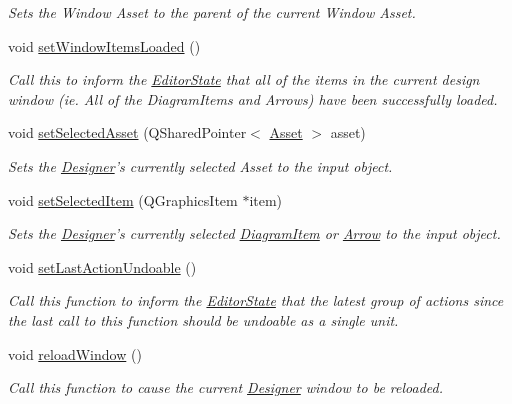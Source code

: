 \begin{DoxyCompactItemize}
\begin{DoxyCompactList}\small\item\em Sets the Window Asset to the parent of the current Window Asset. \end{DoxyCompactList}\item 
void \hyperlink{class_editor_state_acdada8168fd8de85fa44c38ffe621b31}{set\-Window\-Items\-Loaded} ()
\begin{DoxyCompactList}\small\item\em Call this to inform the \hyperlink{class_editor_state}{Editor\-State} that all of the items in the current design window (ie. All of the Diagram\-Items and Arrows) have been successfully loaded. \end{DoxyCompactList}\item 
void \hyperlink{class_editor_state_a1a3d4da1b215113cc85bbc546e7d2845}{set\-Selected\-Asset} (Q\-Shared\-Pointer$<$ \hyperlink{class_picto_1_1_asset}{Asset} $>$ asset)
\begin{DoxyCompactList}\small\item\em Sets the \hyperlink{class_designer}{Designer}'s currently selected Asset to the input object. \end{DoxyCompactList}\item 
void \hyperlink{class_editor_state_a88e0f970839edbfd57e12e4189dc6a4a}{set\-Selected\-Item} (Q\-Graphics\-Item $\ast$item)
\begin{DoxyCompactList}\small\item\em Sets the \hyperlink{class_designer}{Designer}'s currently selected \hyperlink{class_diagram_item}{Diagram\-Item} or \hyperlink{class_arrow}{Arrow} to the input object. \end{DoxyCompactList}\item 
void \hyperlink{class_editor_state_a14a1806929ce9f6fc1c48a5dc356da4f}{set\-Last\-Action\-Undoable} ()
\begin{DoxyCompactList}\small\item\em Call this function to inform the \hyperlink{class_editor_state}{Editor\-State} that the latest group of actions since the last call to this function should be undoable as a single unit. \end{DoxyCompactList}\item 
void \hyperlink{class_editor_state_adc666c4228c6282f14399e454e832bba}{reload\-Window} ()
\begin{DoxyCompactList}\small\item\em Call this function to cause the current \hyperlink{class_designer}{Designer} window to be reloaded. \end{DoxyCompactList}\item 

\end{DoxyCompactItemize}
